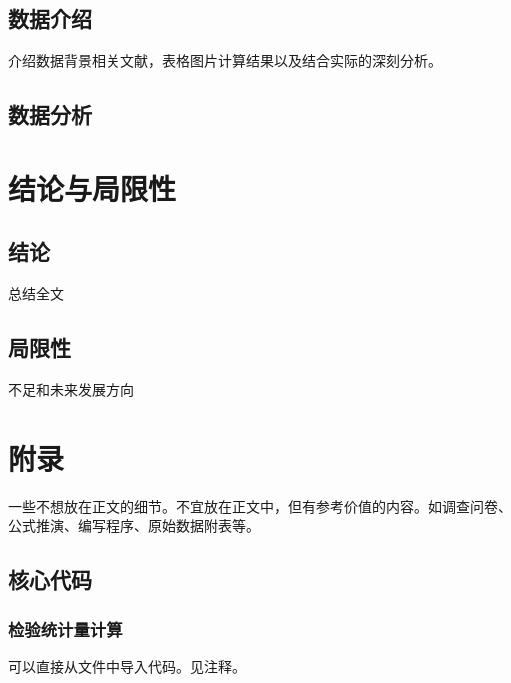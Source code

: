 \documentclass{THUThesis}
\begin{document}
\subsection{数据介绍}
介绍数据背景相关文献，表格图片计算结果以及结合实际的深刻分析。


\subsection{数据分析}


\section{结论与局限性}
\subsection{结论}
总结全文
\subsection{局限性}
不足和未来发展方向

\newpage


 
\section{附录}
一些不想放在正文的细节。不宜放在正文中，但有参考价值的内容。如调查问卷、 公式推演、编写程序、原始数据附表等。
\subsection{核心代码}
\subsubsection{检验统计量计算}
可以直接从文件中导入代码。见注释。
% 
\end{document}

